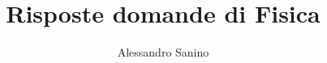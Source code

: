 \documentclass[12pt, a4paper, titlepage]{article}
\title{Risposte domande di Fisica}
\author{Alessandro Sanino}
\begin{document}
	\maketitle
	
	\tableofcontents
	
	
	\pagebreak
	
	
	\pagebreak
	
	
	\pagebreak
	
	
	\pagebreak
	
	
	\pagebreak
	
	
	\pagebreak
	
	
	\pagebreak
	
	
	\pagebreak
	
	
	\pagebreak
	
	
	\pagebreak
	
	
	\pagebreak
	
	
	\pagebreak
	
	
	\pagebreak
	
	
	\pagebreak
	
	
	\pagebreak
	
	
	\pagebreak
	
	
	\pagebreak
\end{document}

